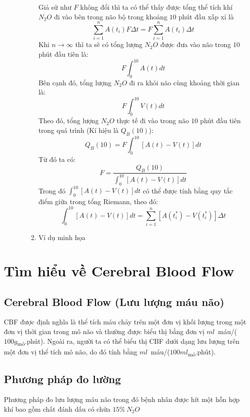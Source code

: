 \documentclass[12pt,a4paper]{article}
\begin{document}
\begin{enumerate}[I/]
\begin{enumerate}[1/]
\begin{enumerate}[a/]
\begin{flushleft}
						Giả sử như $F$ không đổi thì ta có thể thấy được tổng thể tích khí $N_2O$ đi vào bên trong não bộ trong khoảng $10$ phút đầu xấp xỉ là
						$$\sum_{i = 1}^{n} A(t_i)F\Delta t = F \sum_{i = 1}^{n} A(t_i) \Delta t$$
						Khi $n \to \infty$ thì ta sẽ có tổng lượng $N_2O$ được đưa vào não trong $10$ phút đầu tiên là:
						$$F \int_{0}^{10} A(t)dt$$
						Bên cạnh đó, tổng lượng $N_2O$ đi ra khỏi não cùng khoảng thời gian là:
						$$F \int_{0}^{10} V(t)dt$$
						Theo đó, tổng lượng $N_2O$ thực tế đi vào trong não $10$ phút đầu tiên trong quá trình (Kí hiệu là $Q_B(10)$):
						$$Q_B(10)=F\int_{0}^{10}\left[A(t)-V(t)\right]dt$$
						Từ đó ta có:
						$$F=\frac{Q_B(10)}{\displaystyle \int_{0}^{10}\left[A(t) - V(t)\right]dt}$$
						Trong đó $\displaystyle \int_{0}^{10}\left[A(t) - V(t)\right]dt$ có thể được tính bằng quy tắc điểm giữa trong tổng Riemann, theo đó:
						$$\displaystyle \int_{0}^{10}\left[A(t) - V(t)\right]dt = \sum_{i = 1}^{n} \left[A(t_i^*)-V(t_i^*)\right] \Delta t$$
					\end{flushleft}
					\item Ví dụ minh họa
				\end{enumerate}
	\end{enumerate}
\end{enumerate}
\newpage
	\section{Tìm hiểu về Cerebral Blood Flow}
		\subsection{Cerebral Blood Flow (Lưu lượng máu não)}
		\begin{flushleft}
			CBF được định nghĩa là thể tích máu chảy trên một đơn vị khối lượng trong
			một đơn vị thời gian trong mô não và thường được biểu thị bằng đơn vị $ml$\ máu/($100g$\textsubscript{mô}.phút). 
			Ngoài ra, người ta có thể biểu thị CBF dưới dạng lưu lượng trên một đơn vị thể tích mô não, 
			do đó tính bằng $ml$\ máu/($100ml$\textsubscript{mô}.phút).
		\end{flushleft}
		\subsection{Phương pháp đo lường}
		\begin{flushleft}
			Phương pháp đo lưu lượng máu não trong đó bệnh nhân được 
			hít một hỗn hợp khí bao gồm chất đánh dấu có chứa $15\%\ N_2O$
		\end{flushleft}
\end{document}
